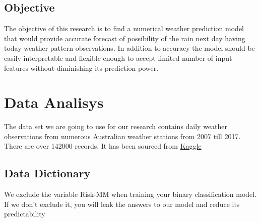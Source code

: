 \hypertarget{objective}{%
\subsection{Objective}\label{objective}}

The objective of this research is to find a numerical weather prediction
model that would provide accurate forecast of possibility of the rain
next day having today weather pattern observations. In addition to
accuracy the model should be easily interpretable and flexible enough to
accept limited number of input features without diminishing its
prediction power.

\hypertarget{data-analisys}{%
\section{Data Analisys}\label{data-analisys}}

The data set we are going to use for our research contains daily weather
observations from numerous Australian weather stations from 2007 till
2017. There are over 142000 records. It has been sourced from
\href{https://www.kaggle.com/jsphyg/weather-dataset-rattle-package}{Kaggle}

\hypertarget{data-dictionary}{%
\subsection{Data Dictionary}\label{data-dictionary}}

We exclude the variable Risk-MM when training your binary classification
model. If we don't exclude it, you will leak the answers to our model
and reduce its predictability

